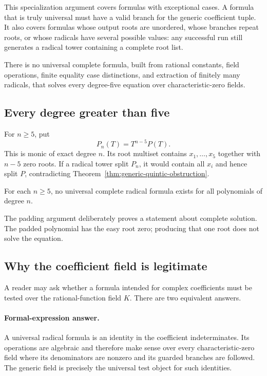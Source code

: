 This specialization argument covers formulas with exceptional cases.  A
formula that is truly universal must have a valid branch for the generic
coefficient tuple.  It also covers formulas whose output roots are unordered,
whose branches repeat roots, or whose radicals have several possible values:
any successful run still generates a radical tower containing a complete root
list.

\begin{theorem}
There is no universal complete formula, built from rational constants, field
operations, finite equality case distinctions, and extraction of finitely
many radicals, that solves every degree-five equation over characteristic-zero
fields.
\end{theorem}

\subsection{Every degree greater than five}

For $n\ge5$, put
\[
 P_n(T)=T^{n-5}P(T).
\]
This is monic of exact degree $n$.  Its root multiset contains
$x_1,\ldots,x_5$ together with $n-5$ zero roots.  If a radical tower split
$P_n$, it would contain all $x_i$ and hence split $P$, contradicting
Theorem~\ref{thm:generic-quintic-obstruction}.

\begin{corollary}
For each $n\ge5$, no universal complete radical formula exists for all
polynomials of degree $n$.
\end{corollary}

The padding argument deliberately proves a statement about complete solution.
The padded polynomial has the easy root zero; producing that one root does not
solve the equation.

\subsection{Why the coefficient field is legitimate}

A reader may ask whether a formula intended for complex coefficients must be
tested over the rational-function field $K$.  There are two equivalent
answers.

\paragraph{Formal-expression answer.}
A universal radical formula is an identity in the coefficient indeterminates.
Its operations are algebraic and therefore make sense over every
characteristic-zero field where its denominators are nonzero and its guarded
branches are followed.  The generic field is precisely the universal test
object for such identities.

